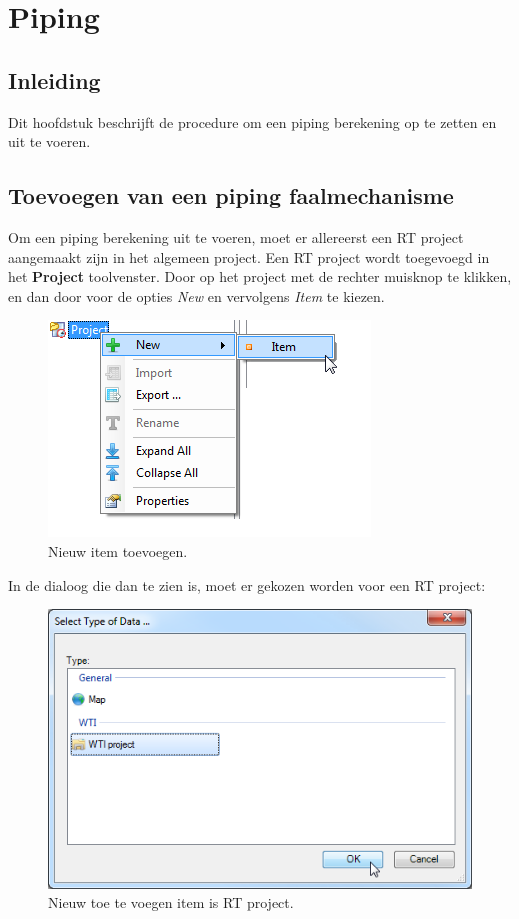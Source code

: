 
\chapter{Piping\label{chap:piping}}

\section{Inleiding}
Dit hoofdstuk beschrijft de procedure om een piping berekening op te zetten en uit te voeren. 

\section{Toevoegen van een piping faalmechanisme}
\label{sec:addpiping}
Om een piping berekening uit te voeren, moet er allereerst een RT project aangemaakt zijn in het algemeen project. Een RT project wordt toegevoegd in het \textbf{Project} toolvenster. Door op het project met de rechter muisknop te klikken, en dan door voor de opties \textit{New} en vervolgens \textit{Item} te kiezen.

\begin{figure} [H]
	\centering
		\includegraphics{figures/chapter_piping/addNewProject}
	\caption{Nieuw item toevoegen.}
	\label{fig:piping.addNewProject}
\end{figure}

In de dialoog die dan te zien is, moet er gekozen worden voor een RT project:

\begin{figure} [H]
	\centering
		\includegraphics{figures/chapter_piping/selectRTProject}
	\caption{Nieuw toe te voegen item is RT project.}
	\label{fig:piping.selectRTProject}
\end{figure}

